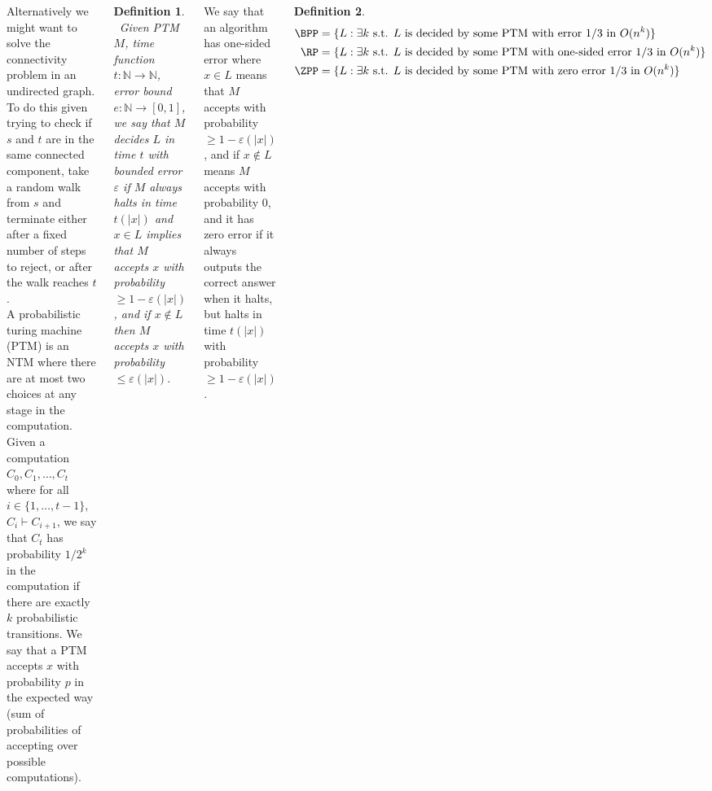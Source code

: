 \documentclass{tikzposter} %
\newtheorem{definition}{Definition}
\begin{document}
\begin{columns}
{  Alternatively we might want to solve the connectivity problem in an undirected graph. To do this given trying to check if $s$ and $t$ are in the same connected component, take a random walk from $s$ and terminate either after a fixed number of steps to reject, or after the walk reaches $t$. \\

  A probabilistic turing machine (PTM) is an NTM where there are at most two choices at any stage in the computation. Given a computation $C_{0},C_{1},\dots,C_{t}$ where for all $i \in \{1,\dots,t-1\}$, $C_{i} \vdash C_{i+1}$, we say that $C_{t}$ has probability $1/2^{k}$ in the computation if there are exactly $k$ probabilistic transitions. We say that a PTM accepts $x$ with probability $p$ in the expected way (sum of probabilities of accepting over possible computations). \\

  \begin{definition}
  \ Given PTM $M$, time function $t : \mathbb{N} \to \mathbb{N}$, error bound $e : \mathbb{N} \to [0,1]$, we say that $M$ decides $L$ in time $t$ with bounded error $\varepsilon$ if $M$ always halts in time $t(|x|)$ and $x \in L$ implies that $M$ accepts $x$ with probability $\ge 1-\varepsilon(|x|)$, and if $x \notin L$ then $M$ accepts $x$ with probability $\le \varepsilon(|x|)$.
  \end{definition}
  \hphantom{}

  We say that an algorithm has one-sided error where $x \in L$ means that $M$ accepts with probability $\ge 1-\varepsilon(|x|)$, and if $x \notin L$ means $M$ accepts with probability $0$, and it has zero error if it always outputs the correct answer when it halts, but halts in time $t(|x|)$ with probability $\ge 1-\varepsilon(|x|)$. \\

  \begin{definition}
  \ \begin{align*}
      \BPP &= \{L : \text{$\exists k$ s.t. $L$ is decided by some PTM with error $1/3$ in $O(n^k)$}\} \\
      \RP &= \{L : \text{$\exists k$ s.t. $L$ is decided by some PTM with one-sided error $1/3$ in $O(n^{k})$}\} \\
      \ZPP &= \{L : \text{$\exists k$ s.t. $L$ is decided by some PTM with zero error $1/3$ in $O(n^{k})$}\}
    \end{align*}
  \end{definition}
  \hphantom{}

}
\end{columns}
\end{document}
